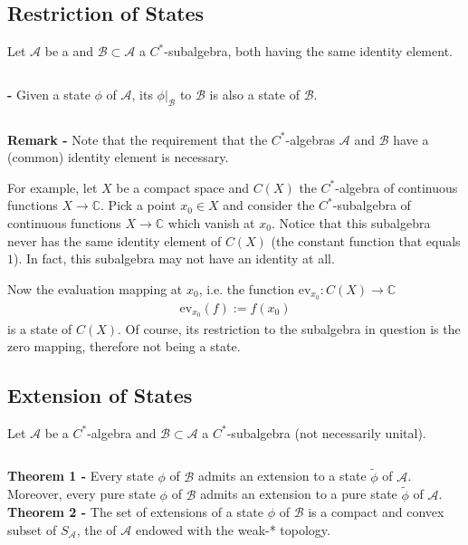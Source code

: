 \documentclass[12pt]{article}
\begin{document}

\subsection{Restriction of States}

Let $\mathcal{A}$ be a  and $\mathcal{B} \subset \mathcal{A}$ a $C^*$-subalgebra, both having the same identity element.

$\,$

{\bf {} -} Given a state $\phi$ of $\mathcal{A}$, its  $\phi|_{\mathcal{B}}$ to $\mathcal{B}$ is also a state of $\mathcal{B}$.

$\,$

{\bf Remark -} Note that the requirement that the $C^*$-algebras $\mathcal{A}$ and $\mathcal{B}$ have a (common) identity element is necessary.

For example, let $X$ be a compact space and $C(X)$ the $C^*$-algebra of continuous functions $X \to \mathbb{C}$. Pick a point $x_0 \in X$ and consider the $C^*$-subalgebra of continuous functions $X \to \mathbb{C}$ which vanish at $x_0$. Notice that this subalgebra never has the same identity element of $C(X)$ (the constant function that equals $1$). In fact, this subalgebra may not have an identity at all.

Now the evaluation mapping at $x_0$, i.e. the function $\mathrm{ev}_{x_0}: C(X) \to \mathbb{C}$
\begin{align*}
\mathrm{ev}_{x_0} (f) := f(x_0)
\end{align*}
is a state of $C(X)$. Of course, its restriction to the subalgebra in question is the zero mapping, therefore not being a state.

\subsection{Extension of States}

Let $\mathcal{A}$ be a $C^*$-algebra and $\mathcal{B} \subset \mathcal{A}$ a $C^*$-subalgebra (not necessarily unital).

$\,$

{\bf Theorem 1 -} Every state $\phi$ of $\mathcal{B}$ admits an extension to a state $\widetilde{\phi}$ of $\mathcal{A}$. Moreover, every pure state $\phi$ of $\mathcal{B}$  admits an extension to a pure state $\widetilde{\phi}$ of $\mathcal{A}$.\\

{\bf Theorem 2 -} The set of extensions of a state $\phi$ of $\mathcal{B}$ is a compact and convex subset of $S_{\mathcal{A}}$, the  of $\mathcal{A}$ endowed with the weak-* topology.

\end{document}
